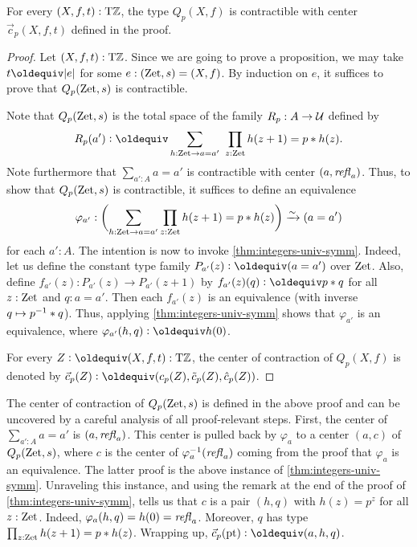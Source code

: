 \documentclass[a4,12pt]{amsart}
\begin{document}
\begin{lemma}\label{lem:guided-null-hmtps}
For every $(X,f,t):{\mathrm{T}\mathbb{Z}}$, the type $Q_p(X,f)$ is contractible
with center $\vec{c}_p(X,f,t)$ defined in the proof.
\end{lemma}
\begin{proof}
  Let $(X,f,t):{\mathrm{T}\mathbb{Z}}$. Since we are going to prove a proposition,
  we may take $t\jdeq\trunc e$ for some $e : (\mathrm{Zet},s)=(X,f)$.
  By induction on $e$, it suffices to prove that $Q_p(\mathrm{Zet},s)$ is contractible.

  Note that $Q_p(\mathrm{Zet},s)$ is the total space of the family $R_p : A \to \mathcal{U}$ defined by
  \[
    R_p(a') \defeq \sum_{h:\zet \to a=a'}~\prod_{z:\zet} h(z+1)=p\ct h(z).
  \]
  Note furthermore that $\sum_{a':A} a=a'$ is contractible with center $(a,\mathop{{\it refl}_{a}})$.
  Thus, to show that $Q_p(\mathrm{Zet},s)$ is contractible,
  it suffices to define an equivalence
  \[
    \varphi_{a'} : \biggl(\sum_{h:\mathrm{Zet} \to a=a'}\prod_{z:\mathrm{Zet}} h(z+1)=p* h(z)\biggr) \xrightarrow{\sim}{} (a=a')
  \]
  for each $a':A$.
  The intention is now to invoke \cref{thm:integers-univ-symm}.
  Indeed, let us define the constant type family $P_{a'}(z)\defeq(a=a')$
  over $\mathrm{Zet}$. Also, define $f_{a'}(z) : P_{a'}(z) \to P_{a'}(z+1)$
  by $f_{a'}(z)(q) \defeq p \ct q$ for all $z:\mathrm{Zet}$ and $q: a=a'$.
  Then each $f_{a'}(z)$ is an equivalence (with inverse $q \mapsto p^{-1}* q$).
  Thus, applying \cref{thm:integers-univ-symm}
  shows that $\varphi_{a'}$ is an equivalence,
  where $\varphi_{a'}(h,q) \defeq h(0)$.

For every $Z\defeq(X,f,t):\TorZ$, the center of contraction of $Q_p(X,f)$ 
is denoted by $\vec{c}_p(Z)\defeq(c_p(Z),\tilde{c}_p(Z),\hat{c}_p(Z))$.
\end{proof}

The center of contraction of $Q_p(\mathrm{Zet},s)$ is defined in the above proof 
and can be uncovered by a careful analysis of all proof-relevant steps.
First, the center of $\sum_{a':A} a=a'$ is $(a,\mathop{{\it refl}_{a}})$.
This center is pulled back by $\varphi_{a}$ to a center
$(a,c)$ of $Q_p(\mathrm{Zet},s)$, where $c$ is the center of 
$\varphi_{a}^{-1}(\mathop{{\it refl}_{a}})$ coming from the proof
that $\varphi_{a}$ is an equivalence. The latter proof
is the above instance of \cref{thm:integers-univ-symm}.
Unraveling this instance, and using the remark at the
end of the proof of \cref{thm:integers-univ-symm},
tells us that $c$ is a pair $(h,q)$ with $h(z)=p^z$
for all $z:\mathrm{Zet}$. Indeed, $\varphi_{a}(h,q) = h(0) = \mathop{{\it refl}_{a}}$.
Moreover, $q$ has type $\prod_{z:\mathrm{Zet}} h(z+1)=p* h(z)$.
Wrapping up, $\vec c_p(\pt)\defeq (a,h,q)$.
\end{document}
